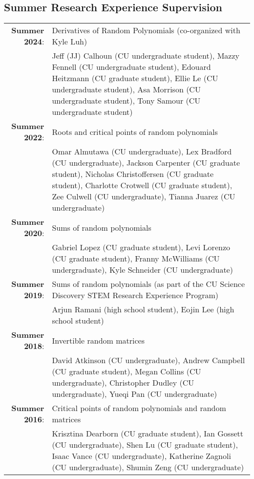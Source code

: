 \documentclass[letterpaper]{article}
\begin{document}
\subsection*{Summer Research Experience Supervision}
   \begin{tabular}{r p{4.65in}}
   {\bf Summer 2024}: & Derivatives of Random Polynomials (co-organized with Kyle Luh) \\
   & Jeff (JJ) Calhoun (CU undergraduate student), Mazzy Fennell (CU undergraduate student), Edouard Heitzmann (CU graduate student), Ellie Le (CU undergraduate student), Asa Morrison (CU undergraduate student), Tony Samour (CU undergraduate student) \\
   {\bf Summer 2022}: & Roots and critical points of random polynomials \\
   & Omar Almutawa (CU undergraduate), Lex Bradford (CU undergraduate), Jackson Carpenter (CU graduate student), Nicholas Christoffersen (CU graduate student), Charlotte Crotwell (CU graduate student),  Zee Culwell (CU undergraduate), Tianna Juarez (CU undergraduate) \\
   {\bf Summer 2020}: & Sums of random polynomials \\
   & Gabriel Lopez (CU graduate student), Levi Lorenzo (CU graduate student), Franny McWilliams (CU undergraduate), Kyle Schneider (CU undergraduate) \\
   {\bf Summer 2019}: & Sums of random polynomials (as part of the CU Science Discovery STEM Research Experience Program) \\
   & Arjun Ramani (high school student), Eojin Lee (high school student) \\
   {\bf Summer 2018}: & Invertible random matrices \\
   & David Atkinson (CU undergraduate), Andrew Campbell (CU graduate student), Megan Collins (CU undergraduate), Christopher Dudley (CU undergraduate), Yueqi Pan (CU undergraduate) \\
   {\bf Summer 2016}: & Critical points of random polynomials and random matrices \\
   & Krisztina Dearborn (CU graduate student), Ian Gossett (CU undergraduate), Shen Lu  (CU graduate student), Isaac Vance (CU undergraduate), Katherine Zagnoli (CU undergraduate), Shumin Zeng (CU undergraduate)
   \end{tabular}
   
\end{document}
